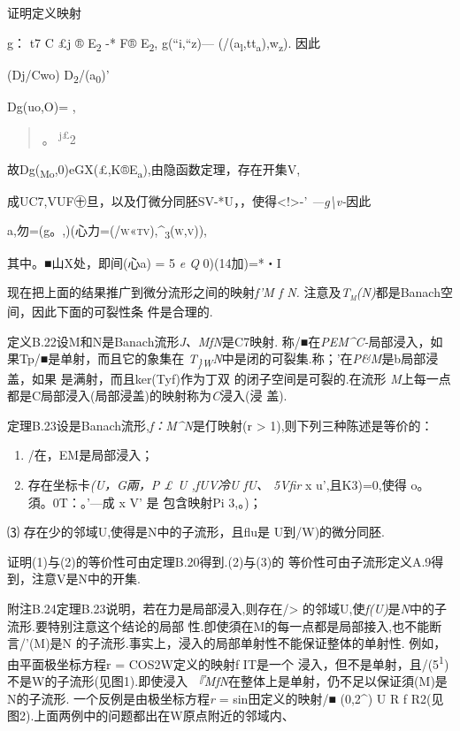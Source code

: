 证明定义映射

g： t7 C £j ® E\textsubscript{2} -* F® E\textsubscript{2}, g(``i,``z)---
(/(a\textsubscript{l},tt\textsubscript{a}),w\textsubscript{z}). 因此

(Dj/Cwo) D\textsubscript{2}/(a\textsubscript{0})'

Dg(uo,O)= ,

\begin{quote}
。 \textsuperscript{j£}2
\end{quote}

故Dg(\textsubscript{Mo},0)eGX(£,K®E\textsubscript{a}),由隐函数定理，存在开集V,

成UC7,VUF㊉旦，以及仃微分同胚SV-*U，，使得\textless{}!\textgreater{}-'
\emph{---g\textbackslash{}v-}因此

a,勿=(g。,)(心力=\textsc{(/w«tv),\^{}\textsubscript{3}(w,v)),}

其中。■山X处，即间(心a) = 5 \emph{e Q} 0)(14加)=*・I

现在把上面的结果推广到微分流形之间的映射\emph{f'M f N.}
注意及\emph{\textsc{T\textsubscript{m}(N)}}都是Banach空间，因此下面的可裂性条
件是合理的.

定义B.22设M和N是Banach流形\emph{J、MfN}是C7映射.
称/■在\emph{PEM\^{}C-}局部浸入，如果Tp/■是单射，而且它的象集在
\emph{T\textsubscript{\}W}N}中是闭的可裂集.称；'在\emph{P\&M}是b局部浸盖，如果
是满射，而且ker(Tyf)作为丁双 的闭子空间是可裂的.在流形
\emph{M}上每一点都是C局部浸入(局部浸盖)的映射称为\emph{C}浸入(浸 盖).

定理B.23设是Banach流形,\emph{f：M\^{}N}是仃映射(r \textgreater{}
1),则下列三种陈述是等价的：

\begin{enumerate}
\def\labelenumi{(\arabic{enumi})}
\item
  /在，EM是局部浸入；
\item
  存在坐标卡\emph{(U，G兩，P £ U ,fUV冷U fU、 5Vfir} x u',且K3)=0,使得
  o。須。0T：。'---成 x V' 是 包含映射Pi 3,。)；
\end{enumerate}

⑶ 存在少的邻域U,使得是N中的子流形，且flu是 U到/W)的微分同胚.

证明(1)与(2)的等价性可由定理B.20得到.(2)与(3)的
等价性可由子流形定义A.9得到，注意V是N中的开集.\textbar{}

附注B.24定理B.23说明，若在力是局部浸入,则存在/\textgreater{}
的邻域U,使\emph{f(U)}是\emph{N}中的子流形.要特别注意这个结论的局部
性.卽使須在M的每一点都是局部接入,也不能断言/'(M)是N
的子流形.事实上，浸入的局部单射性不能保证整体的单射性.
例如，由平面极坐标方程r = COS2W定义的映射f IT是一个
浸入，但不是单射，且/(5\textsuperscript{1})不是W的子流形(见图1).即使浸入
\emph{『MfN}在整体上是单射，仍不足以保证須(M)是N的子流形.
一个反例是由极坐标方程\emph{r} = sin田定义的映射/■ (0,2\^{}) U R f
R2(见图2).上面两例中的问题都出在W原点附近的邻域内、

